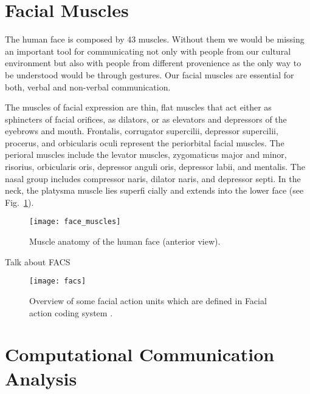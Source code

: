 
\section{Facial Muscles}
\label{sec:anatomy}

The human face is composed by 43 muscles. Without them we would be missing an important tool for communicating not only with people from our cultural environment but also with people from different provenience as the only way to be understood would be through gestures. Our facial muscles are essential for both, verbal and non-verbal communication.\par 

The muscles of facial expression are thin, flat muscles that act either as sphincters of facial orifices, as dilators, or as elevators and depressors of the eyebrows and mouth. Frontalis, corrugator supercilii, depressor supercilii, procerus, and orbicularis oculi represent the periorbital facial muscles. The perioral muscles include the levator muscles, zygomaticus major and minor, risorius, orbicularis oris, depressor anguli oris, depressor labii, and mentalis. The nasal group includes compressor naris, dilator naris, and depressor septi. In the neck, the platysma muscle lies superfi cially and extends into the lower face (see Fig.~\ref{fig:facemuscles}).\cite{Prendergast2013anatomy}


\begin{figure}
    \centering
    \texttt{[image: face\_muscles]}
    \caption{Muscle anatomy of the human face (anterior view).\cite{Prendergast2013anatomy}}
    \label{fig:facemuscles}
\end{figure}

Talk about FACS


\begin{figure}
    \centering
    \texttt{[image: facs]}
    \caption{Overview of some facial action units which are defined in Facial action coding system \cite{Ekman1977}.}
    \label{fig:facs}
\end{figure}


\section{Computational Communication Analysis }

